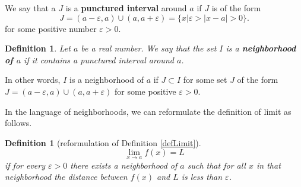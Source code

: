 \documentclass[12pt]{book}
\newtheorem{definition}[theorem]{Definition}
\renewcommand{\emph}{\textbf}
\begin{document}
We say that a $J$ is a \emph{punctured interval} around $a$ if $J$ is of the form 
\[
J= (a-\varepsilon,a)\cup (a, a+\varepsilon)=\{x| \varepsilon>|x-a|>0\}.
\]
for some positive number $\varepsilon>0$.
\begin{definition}
Let $a$ be a real number. We say that the set $I$ is a \emph{neighborhood of $a$} if it contains a punctured interval around $a$.
\end{definition}
In other words,  $I$  is a neighborhood of $a$  if $J\subset I$ for some set $J$ of the form $ J= (a-\varepsilon,a)\cup (a, a+\varepsilon)$ for some positive $\varepsilon>0$.

In the language of neighborhoods, we can reformulate the definition of limit as follows.

\begin{definition}[reformulation of Definition \ref{defLimit}]
\[\lim\limits_{x\to a} f(x)=L
\]
if for every $\varepsilon>0$ there exists a neighborhood of $a$ such that for all $x$ in that neighborhood the distance between $f(x)$ and $L$ is less than $\varepsilon$.
\end{definition}
\end{document}
